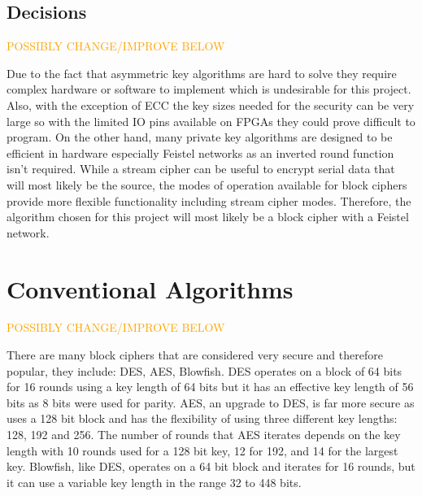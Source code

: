 \documentclass[12pt,twoside,a4paper]{report}
\begin{document}
    \subsection{Decisions}
    \label{section:cryp_decisions}
    
    \textcolor{orange}{POSSIBLY CHANGE/IMPROVE BELOW}
    
    Due to the fact that asymmetric key algorithms are hard to solve they require complex hardware or software to implement which is undesirable for this project. Also, with the exception of ECC the key sizes needed for the security can be very large so with the limited IO pins available on FPGAs they could prove difficult to program. On the other hand, many private key algorithms are designed to be efficient in hardware especially Feistel networks as an inverted round function isn't required. While a stream cipher can be useful to encrypt serial data that will most likely be the source, the modes of operation available for block ciphers provide more flexible functionality including stream cipher modes. Therefore, the algorithm chosen for this project will most likely be a block cipher with a Feistel network.
    
    \section{Conventional Algorithms}

    \textcolor{orange}{POSSIBLY CHANGE/IMPROVE BELOW}
    
    There are many block ciphers that are considered very secure and therefore popular, they include: DES\cite{ComputerSecurityDivision1999}, AES\cite{ComputerSecurityDivision2001}, Blowfish\cite{BruceSchneier1994}.
    DES operates on a block of 64 bits for 16 rounds using a key length of 64 bits but it has an effective key length of 56 bits as 8 bits were used for parity.
    AES, an upgrade to DES, is far more secure as uses a 128 bit block and has the flexibility of using three different key lengths: 128, 192 and 256. The number of rounds that AES iterates depends on the key length with 10 rounds used for a 128 bit key, 12 for 192, and 14 for the largest key.
    Blowfish, like DES, operates on a 64 bit block and iterates for 16 rounds, but it can use a variable key length in the range 32 to 448 bits.
    
\end{document}
